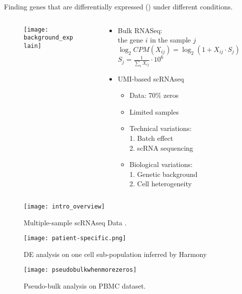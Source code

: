 
\begin{frame}
  Finding genes that are differentially expressed () under
  different conditions. 
  \begin{columns}
    \begin{column}{0.6\textwidth}
      \begin{figure}
        \centering
        \texttt{[image: background\_explain]}
      \end{figure}
    \end{column}
    \begin{column}{0.45\textwidth}
      \begin{itemize}
      \item Bulk RNASeq: \\the gene \(i\) in the sample \(j\)
        \({\scriptstyle \log_2CPM(X_{ij}) = \log_2(1 + X_{ij} \cdot S_{j}) }\) \\
        \({\scriptstyle S_j =\frac{1}{\sum_{i} X_{ij}} \cdot 10^6}\)
    \item UMI-based scRNAseq
      \begin{itemize}
      \item Data: 70\% zeros
      \item Limited samples
      \item Technical variations:\\
        1. Batch effect\\
        2. scRNA sequencing
      \item Biological variations:\\
        1. Genetic background \\
        2. Cell heterogeneity
         \end{itemize}
      \end{itemize}
    \end{column}
  \end{columns}
\end{frame}

\begin{frame}
  \begin{figure}
    \centering
    \texttt{[image: intro\_overview]}
    \caption{Multiple-sample scRNAseq Data \cite{durante2020single}.}
  \end{figure}
\end{frame}

\begin{frame}
  \begin{figure}
    \centering
    \texttt{[image: patient-specific.png]}
    \caption{DE analysis on one cell sub-population inferred by Harmony
      \cite{korsunsky2019fast}}
  \end{figure}
\end{frame}

\begin{frame}
  \begin{figure}
    \centering
    \texttt{[image: pseudobulkwhenmorezeros]}
    \caption{Pseudo-bulk analysis \cite{schmid2020design} on PBMC dataset.}
  \end{figure}
\end{frame}

